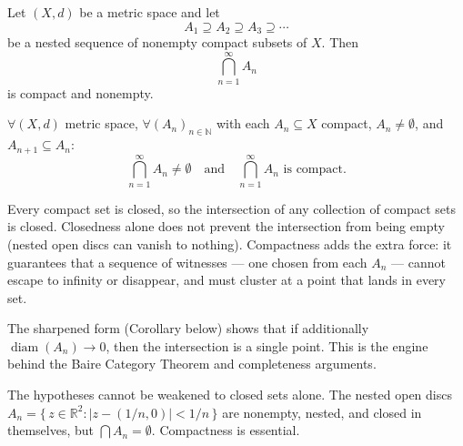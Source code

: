 \begin{theorem}
\label{thm:cantors-intersection-theorem}
Let $(X, d)$ be a metric space and let
\[
  A_1 \supseteq A_2 \supseteq A_3 \supseteq \cdots
\]
be a nested sequence of nonempty compact subsets of $X$. Then
\[
  \bigcap_{n=1}^{\infty} A_n
\]
is compact and nonempty.
\end{theorem}

\begin{remark*}
$\forall (X,d)$ metric space,
$\forall (A_n)_{n \in \mathbb{N}}$ with each $A_n \subseteq X$ compact, $A_n \neq \emptyset$,
and $A_{n+1} \subseteq A_n$:
\[
  \bigcap_{n=1}^{\infty} A_n \neq \emptyset
  \quad\text{and}\quad
  \bigcap_{n=1}^{\infty} A_n \text{ is compact.}
\]
\end{remark*}

\begin{remark*}[Intuition]
Every compact set is closed, so the intersection of any collection of compact sets
is closed. Closedness alone does not prevent the intersection from being empty
(nested open discs can vanish to nothing). Compactness adds the extra force:
it guarantees that a sequence of witnesses --- one chosen from each $A_n$ --- cannot
escape to infinity or disappear, and must cluster at a point that lands in every set.
\end{remark*}

\begin{remark*}[Consequence]
The sharpened form (Corollary below) shows that if additionally
$\operatorname{diam}(A_n) \to 0$, then the intersection is a single point.
This is the engine behind the Baire Category Theorem and completeness arguments.
\end{remark*}

\begin{remark*}
The hypotheses cannot be weakened to closed sets alone. The nested open discs
$A_n = \{\,z \in \mathbb{R}^2 : |z - (1/n, 0)| < 1/n\,\}$
are nonempty, nested, and closed in themselves, but $\bigcap A_n = \emptyset$.
Compactness is essential.
\end{remark*}




